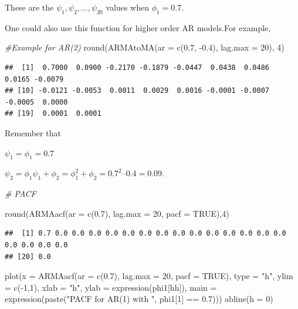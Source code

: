 \documentclass[
]{book}
\newenvironment{Shaded}{\begin{snugshade}}{\end{snugshade}}
\newcommand{\AttributeTok}[1]{\textcolor[rgb]{0.77,0.63,0.00}{#1}}
\newcommand{\CommentTok}[1]{\textcolor[rgb]{0.56,0.35,0.01}{\textit{#1}}}
\newcommand{\ConstantTok}[1]{\textcolor[rgb]{0.00,0.00,0.00}{#1}}
\newcommand{\DecValTok}[1]{\textcolor[rgb]{0.00,0.00,0.81}{#1}}
\newcommand{\FloatTok}[1]{\textcolor[rgb]{0.00,0.00,0.81}{#1}}
\newcommand{\FunctionTok}[1]{\textcolor[rgb]{0.00,0.00,0.00}{#1}}
\newcommand{\NormalTok}[1]{#1}
\newcommand{\SpecialCharTok}[1]{\textcolor[rgb]{0.00,0.00,0.00}{#1}}
\newcommand{\StringTok}[1]{\textcolor[rgb]{0.31,0.60,0.02}{#1}}
\theoremstyle{definition}
\theoremstyle{definition}
\theoremstyle{definition}
\theoremstyle{definition}
\theoremstyle{remark}
\begin{document}
These are the \(\psi_1, \psi_2, …, \psi_{20}\) values when \(\phi_1 = 0.7.\)

One could also use this function for higher order AR models.For example,

\begin{Shaded}
\begin{Highlighting}[]
\CommentTok{\#Example for AR(2)}
\FunctionTok{round}\NormalTok{(}\FunctionTok{ARMAtoMA}\NormalTok{(}\AttributeTok{ar =} \FunctionTok{c}\NormalTok{(}\FloatTok{0.7}\NormalTok{, }\SpecialCharTok{{-}}\FloatTok{0.4}\NormalTok{), }\AttributeTok{lag.max =} \DecValTok{20}\NormalTok{), }\DecValTok{4}\NormalTok{)}
\end{Highlighting}
\end{Shaded}

\begin{verbatim}
##  [1]  0.7000  0.0900 -0.2170 -0.1879 -0.0447  0.0438  0.0486  0.0165 -0.0079
## [10] -0.0121 -0.0053  0.0011  0.0029  0.0016 -0.0001 -0.0007 -0.0005  0.0000
## [19]  0.0001  0.0001
\end{verbatim}

Remember that

\(\psi_1 = \phi_1 = 0.7\)

\(\psi_2 = \phi_1\psi_1+\phi_2 = \phi_1^2 + \phi_2 = 0.7^2 – 0.4 = 0.09.\)

\begin{Shaded}
\begin{Highlighting}[]
\CommentTok{\# PACF}

  \FunctionTok{round}\NormalTok{(}\FunctionTok{ARMAacf}\NormalTok{(}\AttributeTok{ar =} \FunctionTok{c}\NormalTok{(}\FloatTok{0.7}\NormalTok{), }\AttributeTok{lag.max =} \DecValTok{20}\NormalTok{, }\AttributeTok{pacf =} \ConstantTok{TRUE}\NormalTok{),}\DecValTok{4}\NormalTok{)}
\end{Highlighting}
\end{Shaded}

\begin{verbatim}
##  [1] 0.7 0.0 0.0 0.0 0.0 0.0 0.0 0.0 0.0 0.0 0.0 0.0 0.0 0.0 0.0 0.0 0.0 0.0 0.0
## [20] 0.0
\end{verbatim}

\begin{Shaded}
\begin{Highlighting}[]
  \FunctionTok{plot}\NormalTok{(}\AttributeTok{x =} \FunctionTok{ARMAacf}\NormalTok{(}\AttributeTok{ar =} \FunctionTok{c}\NormalTok{(}\FloatTok{0.7}\NormalTok{), }\AttributeTok{lag.max =} \DecValTok{20}\NormalTok{, }\AttributeTok{pacf =} \ConstantTok{TRUE}\NormalTok{), }\AttributeTok{type =} \StringTok{"h"}\NormalTok{, }\AttributeTok{ylim =} \FunctionTok{c}\NormalTok{(}\SpecialCharTok{{-}}\DecValTok{1}\NormalTok{,}\DecValTok{1}\NormalTok{), }\AttributeTok{xlab =} \StringTok{"h"}\NormalTok{, }\AttributeTok{ylab =} \FunctionTok{expression}\NormalTok{(phi1[hh]),}
       \AttributeTok{main =} \FunctionTok{expression}\NormalTok{(}\FunctionTok{paste}\NormalTok{(}\StringTok{"PACF for AR(1) with "}\NormalTok{, phi1[}\DecValTok{1}\NormalTok{] }\SpecialCharTok{==} \FloatTok{0.7}\NormalTok{)))}
  \FunctionTok{abline}\NormalTok{(}\AttributeTok{h =} \DecValTok{0}\NormalTok{)}
\end{Highlighting}
\end{Shaded}
\end{document}
